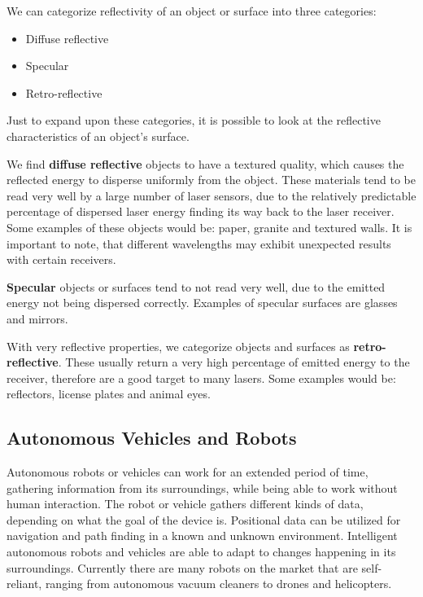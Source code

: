 We can categorize reflectivity of an object or surface into three categories:\cite{reflectivity}

\begin{itemize}
	\item Diffuse reflective
	\item Specular
	\item Retro-reflective
\end{itemize}

Just to expand upon these categories, it is possible to look at the reflective characteristics of an object's surface.

We find \textbf{diffuse reflective} objects to have a textured quality, which causes the reflected energy to disperse uniformly from the object. These materials tend to be read very well by a large number of laser sensors, due to the relatively predictable percentage of dispersed laser energy finding its way back to the laser receiver. Some examples of these objects would be: paper, granite and textured walls. It is important to note, that different wavelengths may exhibit unexpected results with certain receivers.

\textbf{Specular} objects or surfaces tend to not read very well, due to the emitted energy not being dispersed correctly. Examples of specular surfaces are glasses and mirrors.

With very reflective properties, we categorize objects and surfaces as \textbf{retro-reflective}. These usually return a very high percentage of emitted energy to the receiver, therefore are a good target to many lasers. Some examples would be: reflectors, license plates and animal eyes.

\subsection{Autonomous Vehicles and Robots}

Autonomous robots or vehicles can work for an extended period of time, gathering information from its surroundings, while being able to work without human interaction. The robot or vehicle gathers different kinds of data, depending on what the goal of the device is. Positional data can be utilized for navigation and path finding in a known and unknown environment. Intelligent autonomous robots and vehicles are able to adapt to changes happening in its surroundings. Currently there are many robots on the market that are self-reliant, ranging from autonomous vacuum cleaners to drones and helicopters\cite{autonomousbasic}.

